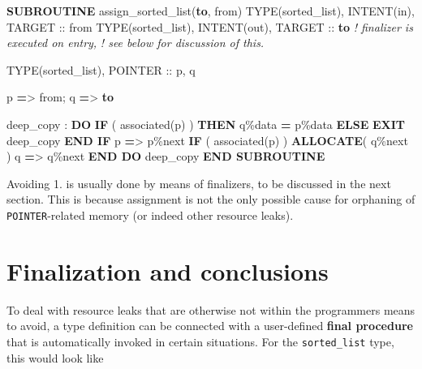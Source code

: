 \documentclass[
]{scrartcl}
\newenvironment{Shaded}{}{}
\newcommand{\CommentTok}[1]{\textcolor[rgb]{0.38,0.63,0.69}{\textit{#1}}}
\newcommand{\DataTypeTok}[1]{\textcolor[rgb]{0.56,0.13,0.00}{#1}}
\newcommand{\FunctionTok}[1]{\textcolor[rgb]{0.02,0.16,0.49}{#1}}
\newcommand{\KeywordTok}[1]{\textcolor[rgb]{0.00,0.44,0.13}{\textbf{#1}}}
\newcommand{\NormalTok}[1]{#1}
\newcommand{\OperatorTok}[1]{\textcolor[rgb]{0.40,0.40,0.40}{#1}}
\begin{document}
\begin{Shaded}
\begin{Highlighting}[]
\KeywordTok{SUBROUTINE}\NormalTok{ assign\_sorted\_list(}\KeywordTok{to}\NormalTok{, from)}
   \DataTypeTok{TYPE(sorted\_list)}\NormalTok{, }\DataTypeTok{INTENT(in)}\NormalTok{, }\DataTypeTok{TARGET} \DataTypeTok{::}\NormalTok{ from}
   \DataTypeTok{TYPE(sorted\_list)}\NormalTok{, }\DataTypeTok{INTENT(out)}\NormalTok{, }\DataTypeTok{TARGET} \DataTypeTok{::} \KeywordTok{to}   \CommentTok{! finalizer is executed on entry,}
                                                  \CommentTok{! see below for discussion of this.}

   \DataTypeTok{TYPE(sorted\_list)}\NormalTok{, }\DataTypeTok{POINTER} \DataTypeTok{::}\NormalTok{ p, q}

\NormalTok{   p }\KeywordTok{=}\OperatorTok{\textgreater{}}\NormalTok{ from; q }\KeywordTok{=}\OperatorTok{\textgreater{}} \KeywordTok{to}

\NormalTok{   deep\_copy : }\KeywordTok{DO}
      \KeywordTok{IF}\NormalTok{ ( }\FunctionTok{associated}\NormalTok{(p) ) }\KeywordTok{THEN}
\NormalTok{         q}\OperatorTok{\%}\NormalTok{data }\KeywordTok{=}\NormalTok{ p}\OperatorTok{\%}\NormalTok{data}
      \KeywordTok{ELSE}
         \KeywordTok{EXIT}\NormalTok{ deep\_copy}
      \KeywordTok{END IF}
\NormalTok{      p }\KeywordTok{=}\OperatorTok{\textgreater{}}\NormalTok{ p}\OperatorTok{\%}\NormalTok{next}
      \KeywordTok{IF}\NormalTok{ ( }\FunctionTok{associated}\NormalTok{(p) ) }\KeywordTok{ALLOCATE}\NormalTok{( q}\OperatorTok{\%}\NormalTok{next )}
\NormalTok{      q }\KeywordTok{=}\OperatorTok{\textgreater{}}\NormalTok{ q}\OperatorTok{\%}\NormalTok{next}
   \KeywordTok{END DO}\NormalTok{ deep\_copy}
\KeywordTok{END SUBROUTINE}
\end{Highlighting}
\end{Shaded}

Avoiding 1. is usually done by means of finalizers, to be discussed in
the next section. This is because assignment is not the only possible
cause for orphaning of \texttt{POINTER}-related memory (or indeed other
resource leaks).

\section{Finalization and
conclusions}\label{finalization-and-conclusions}

To deal with resource leaks that are otherwise not within the
programmer\textquotesingle s means to avoid, a type definition can be
connected with a user-defined \textbf{final procedure} that is
automatically invoked in certain situations. For the
\texttt{sorted\_list} type, this would look like
\end{document}
